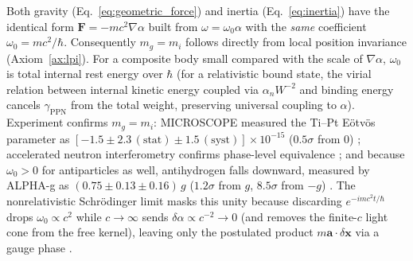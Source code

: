\documentclass[aps,prd,onecolumn,tightenlines,nofootinbib,notitlepage,10pt,floatfix]{revtex4-2}
\theoremstyle{indentedtheorem}
\begin{document}
Both gravity (Eq.~\eqref{eq:geometric_force}) and inertia (Eq.~\eqref{eq:inertia}) have the identical form $\mathbf{F}=-mc^2\nabla\alpha$ built from $\omega=\omega_0\alpha$ with the \emph{same} coefficient $\omega_0=mc^2/\hbar$. Consequently $m_g=m_i$ follows directly from local position invariance (Axiom~\ref{ax:lpi}). For a composite body small compared with the scale of $\nabla\alpha$, $\omega_0$ is total internal rest energy over $\hbar$ (for a relativistic bound state, the virial relation between internal kinetic energy coupled via $\alpha_n W^{-2}$ and binding energy cancels $\gamma_\text{PPN}$ from the total weight, preserving universal coupling to $\alpha$). Experiment confirms $m_g=m_i$: MICROSCOPE measured the Ti--Pt E\"otv\"os parameter as $[-1.5\pm 2.3\,(\text{stat})\pm 1.5\,(\text{syst})]\times 10^{-15}$ ($0.5\sigma$ from $0$) \citep{Touboul2017Microscope,Touboul2022Final}; accelerated neutron interferometry confirms phase-level equivalence \citep{Bonse1983Measurement}; and because $\omega_0>0$ for antiparticles as well, antihydrogen falls downward, measured by ALPHA-g as $(0.75\pm 0.13\pm 0.16)\,g$ ($1.2\sigma$ from $g$, $8.5\sigma$ from $-g$) \citep{Anderson2023Observation}. The nonrelativistic Schr\"odinger limit masks this unity because discarding $e^{-imc^2t/\hbar}$ drops $\omega_0\propto c^2$ while $c\to\infty$ sends $\delta\alpha\propto c^{-2}\to 0$ (and removes the finite-$c$ light cone from the free kernel), leaving only the postulated product $m\mathbf{a}\cdot\delta\mathbf{x}$ via a gauge phase \citep{Shukla2010Gauge}.
\end{document}
